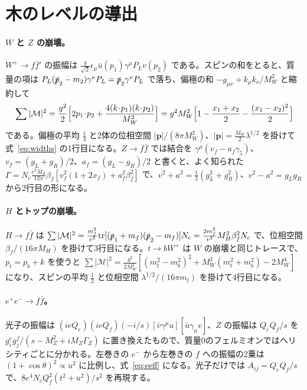 \documentclass[a4paper,10pt]{ltjsarticle}
\newcommand{\tr}{\mathrm{tr}}
\begin{document}
\section{木のレベルの導出}\label{app:tree}

\paragraph{$W$ と $Z$ の崩壊。}$W^+\to f\bar f'$ の振幅は $\frac{g}{\sqrt2}\epsilon_\mu\bar u(p_1)\gamma^\mu P_Lv(p_2)$ である。スピンの和をとると、質量の項は $P_L(\slashed p_2-m_2)\gamma^\nu P_L=\slashed p_2\gamma^\nu P_L$ で落ち、偏極の和 $-g_{\mu\nu}+k_\mu k_\nu/M_W^2$ と縮約して
\begin{equation*}
\sum|\mathcal M|^2=\frac{g^2}2\Bigl[2p_1\!\cdot\!p_2+\frac{4(k\!\cdot\!p_1)(k\!\cdot\!p_2)}{M_W^2}\Bigr]=g^2M_W^2\Bigl[1-\frac{x_1+x_2}2-\frac{(x_1-x_2)^2}2\Bigr]
\end{equation*}
である。偏極の平均 $\frac13$ と2体の位相空間 $|\boldsymbol p|/(8\pi M_W^2)$、$|\boldsymbol p|=\frac{M_W}2\lambda^{1/2}$ を掛けて式~\eqref{eq:widths} の1行目になる。$Z\to f\bar f$ では結合を $\gamma^\mu(v_f-a_f\gamma_5)$、$v_f=(g_L+g_R)/2$、$a_f=(g_L-g_R)/2$ と書くと、よく知られた $\Gamma=N_c\frac{e^2M_Z}{12\pi}\beta_f[v_f^2(1+2x_f)+a_f^2\beta_f^2]$ で、$v^2+a^2=\frac12(g_L^2+g_R^2)$、$v^2-a^2=g_Lg_R$ から2行目の形になる。

\paragraph{$H$ とトップの崩壊。}$H\to f\bar f$ は $\sum|\mathcal M|^2=\frac{m_f^2}{v^2}\tr[(\slashed p_1+m_f)(\slashed p_2-m_f)]N_c=\frac{2m_f^2}{v^2}M_H^2\beta_f^2N_c$ で、位相空間 $\beta_f/(16\pi M_H)$ を掛けて3行目になる。$t\to bW^+$ は $W$ の崩壊と同じトレースで、$p_t=p_b+k$ を使うと $\sum|\mathcal M|^2=\frac{g^2}{2M_W^2}[(m_t^2-m_b^2)^2+M_W^2(m_t^2+m_b^2)-2M_W^4]$ になり、スピンの平均 $\frac12$ と位相空間 $\lambda^{1/2}/(16\pi m_t)$ を掛けて4行目になる。

\paragraph{$e^+e^-\to f\bar f$。}光子の振幅は $(ieQ_e)(ieQ_f)(-i/s)[\bar v\gamma^\mu u][\bar u\gamma_\mu v]$、$Z$ の振幅は $Q_eQ_f/s$ を $g_i^eg_j^f/(s-M_Z^2+iM_Z\Gamma_Z)$ に置き換えたもので、質量0のフェルミオンではヘリシティごとに分かれる。左巻きの $e^-$ から左巻きの $f$ への振幅の2乗は $(1+\cos\theta)^2\propto u^2$ に比例し、式~\eqref{eq:eeff} になる。光子だけでは $A_{ij}=Q_eQ_f/s$ で、$8e^4N_cQ_f^2(t^2+u^2)/s^2$ を再現する。
\end{document}
